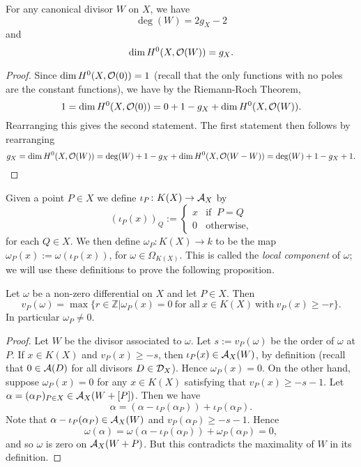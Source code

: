     \begin{cor}\label{dim=gc}
    For any canonical divisor $W$ on $X$, we have 
        \[
        \deg(W) = 2g_X-2
        \]
    and 
        \[
        \dim H^0(X,{\cal O}(W)) = g_X.
        \]
    \end{cor}
    \begin{proof}
    Since $\dim H^0(X,{\cal O}(0)) = 1$ (recall that the only functions with no poles are the constant functions), we have by the Riemann-Roch Theorem, 
        \[
        1= \dim H^0(X,{\cal O}(0)) = 0 + 1 -g_X + \dim H^0(X,{\cal O}(W)).
        \]
    Rearranging this gives the second statement.
    The first statement then follows by rearranging
        \[
        g_X = \dim H^0(X,{\cal O}(W)) = \deg(W) + 1 -g_X +  \dim H^0(X,{\cal O}(W-W))= \deg(W) + 1 -g_X + 1.
        \]
    \end{proof}


Given a point $P\in X$ we define $\iota_P\colon K(X) \rightarrow {\mathcal A}_X$ by
    \begin{equation}
    (\iota_P(x))_Q:= 
        \begin{cases}
        x & \text{if }\ P=Q\\
        0 & \text{otherwise},
        \end{cases}
    \end{equation}
for each $Q\in X$.
We then define $\omega_P\colon K(X) \rightarrow k$ to be the map $\omega_P(x) := \omega(\iota_P(x))$, for $\omega \in \Omega_{K(X)}$.
This is called the {\em local component} of $\omega$; we will use these definitions to prove the following proposition.

    \begin{prop}\label{propertyofomega}
    Let $\omega$ be a non-zero differential on $X$ and let $P\in X$. Then
        \[
        v_P(\omega) = \max \{r\in \mathbb{Z}|\omega_P(x) = 0\ \text{for all} \ x\in K(X) \ \text{with}\ v_P(x) \geq -r\}.
        \]
    In particular $\omega_P \neq 0$.
    \end{prop}
    \begin{proof}
    Let $W$ be the divisor associated to $\omega$.
    Let $s:=v_P(\omega)$ be the order of $\omega$ at $P$.
    If $x\in K(X)$ and $v_P(x)\geq -s$, then $\iota_P(x) \in {\mathcal A}_X(W)$, by definition (recall that $0 \in {\mathcal A}(D)$ for all divisors $D \in {\mathcal D}_X$).
    Hence $\omega_P(x) = 0$.
    On the other hand, suppose $\omega_P(x) = 0$ for any $x\in K(X)$ satisfying that $v_P(x) \geq -s-1$.
    Let $\alpha = (\alpha_P)_{P \in X} \in {\mathcal A}_X(W+[P])$.
    Then we have
        \[
        \alpha = (\alpha-\iota_P(\alpha_P)) + \iota_P(\alpha_P).
        \]
    Note that $\alpha - \iota_P(\alpha_P)\in {\mathcal A}_X(W)$ and $v_P(\alpha_P) \geq -s-1$.
    Hence
        \[
        \omega(\alpha) = \omega(\alpha-\iota_P(\alpha_P))  + \omega_P(\alpha_P) = 0,
        \]
    and so $\omega$ is zero on ${\mathcal A}_X(W+P)$.
    But this contradicts the maximality of $W$ in its definition.
    \end{proof}

